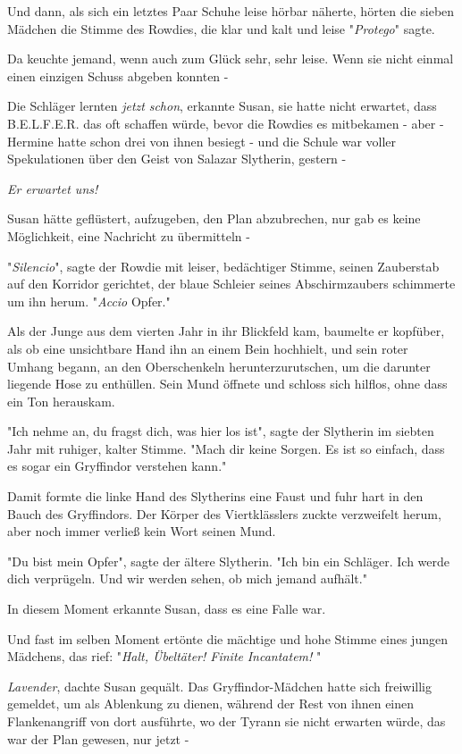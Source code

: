 {Und dann, als sich ein letztes Paar Schuhe leise hörbar näherte, hörten die sieben Mädchen die Stimme des Rowdies, die klar und kalt und leise "\emph{Protego}" sagte.

Da keuchte jemand, wenn auch zum Glück sehr, sehr leise. Wenn sie nicht einmal einen einzigen Schuss abgeben konnten -

Die Schläger lernten \emph{jetzt} \emph{schon}, erkannte Susan, sie hatte nicht erwartet, dass B.E.L.F.E.R. das oft schaffen würde, bevor die Rowdies es mitbekamen - aber - Hermine hatte schon drei von ihnen besiegt - und die Schule war voller Spekulationen über den Geist von Salazar Slytherin, gestern -

\emph{\emph{Er erwartet uns!}}

Susan hätte geflüstert, aufzugeben, den Plan abzubrechen, nur gab es keine Möglichkeit, eine Nachricht zu übermitteln -

"\emph{Silencio}", sagte der Rowdie mit leiser, bedächtiger Stimme, seinen Zauberstab auf den Korridor gerichtet, der blaue Schleier seines Abschirmzaubers schimmerte um ihn herum. "\emph{Accio} Opfer."

Als der Junge aus dem vierten Jahr in ihr Blickfeld kam, baumelte er kopfüber, als ob eine unsichtbare Hand ihn an einem Bein hochhielt, und sein roter Umhang begann, an den Oberschenkeln herunterzurutschen, um die darunter liegende Hose zu enthüllen. Sein Mund öffnete und schloss sich hilflos, ohne dass ein Ton herauskam.

"Ich nehme an, du fragst dich, was hier los ist", sagte der Slytherin im siebten Jahr mit ruhiger, kalter Stimme. "Mach dir keine Sorgen. Es ist so einfach, dass es sogar ein Gryffindor verstehen kann."

Damit formte die linke Hand des Slytherins eine Faust und fuhr hart in den Bauch des Gryffindors. Der Körper des Viertklässlers zuckte verzweifelt herum, aber noch immer verließ kein Wort seinen Mund.

"Du bist mein Opfer", sagte der ältere Slytherin. "Ich bin ein Schläger. Ich werde dich verprügeln. Und wir werden sehen, ob mich jemand aufhält."

In diesem Moment erkannte Susan, dass es eine Falle war.

Und fast im selben Moment ertönte die mächtige und hohe Stimme eines jungen Mädchens, das rief: "\emph{Halt, Übeltäter! Finite} \emph{Incantatem!} "

\emph{Lavender}, dachte Susan gequält. Das Gryffindor-Mädchen hatte sich freiwillig gemeldet, um als Ablenkung zu dienen, während der Rest von ihnen einen Flankenangriff von dort ausführte, wo der Tyrann sie nicht erwarten würde, das war der Plan gewesen, nur jetzt -

}
